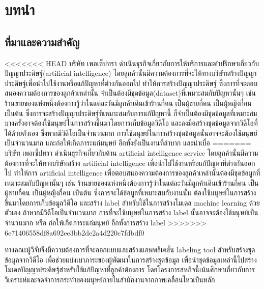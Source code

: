 \chapter{บทนำ}
\section{ที่มาและความสำคัญ}
<<<<<<< HEAD
บริษัท เพอเซ็ปทรา ดำเนินธุรกิจเกี่ยวกับการให้บริการและคำปรึกษาเกี่ยวกับปัญญาประดิษฐ์(artificial intelligence)
โดยลูกค้านั้นมีความต้องการที่จะให้ทางบริษัทสร้างปัญญาประดิษฐ์เพื่อนำไปใช้งานหรือแก้ปัญหาที่ต่างกันออกไป 
ทำให้การสร้างปัญญาประดิษฐ์ ซึ่งการที่จะตอบสนองความต้องการของลูกค้าเหล่านั้น 
จำเป็นต้องมีชุดข้อมูล(dataset)ที่เหมาะสมกับปัญหานั้นๆ เช่น ร้านขายของแห่งหนึ่งต้องการรู้ว่าในแต่ละวันมีลูกค้าเดินเข้าร้านกี่คน เป็นผู้ชายกี่คน เป็นผู้หญิงกี่คน เป็นต้น
ซึ่งการจะสร้างปัญญาประดิษฐ์ที่เหมาะสมกับการแก้ปัญหานี้ ก็จำเป็นต้องมีชุดข้อมูลที่เหมาะสม บางครั้งอาจต้องใช้มนุษย์ในการสร้างขึ้นมาโดยการเก็บข้อมูลวิดีโอ 
และลงมือสร้างชุดข้อมูลจากวิดีโอที่ได้ด้วยตัวเอง ซึ่งหากมีวิดีโอเป็นจำนวนมาก การใช้มนุษย์ในการสร้างชุดข้อมูลนั้นอาจจะต้องใช้มนุษย์เป็นจำนวนมาก 
และก่อให้เกิดภาระแก่มนุษย์ อีกทั้งยังเป็นงานที่ลำบาก และน่าเบื่อ
=======
บริษัท เพอเซ็ปทรา ดำเนินธุรกิจเกี่ยวกับด้าน artificial intelligence service โดยลูกค้านั้นมีความต้องการที่จะให้ทางบริษัทสร้าง artificial intelligence เพื่อนำไปใช้งานหรือแก้ปัญหาที่ต่างกันออกไป ทำให้การ artificial intelligence เพื่อตอบสนองความต้องการของลูกค้าเหล่านั้นต้องมีชุดข้อมูลที่เหมาะสมกับปัญหานั้นๆ เช่น ร้านขายของแห่งหนึ่งต้องการรู้ว่าในแต่ละวันมีลูกค้าเดินเข้าร้านกี่คน เป็นผู้ชายกี่คน เป็นผู้หญิงกี่คน เป็นต้น ซึ่งการจะได้ข้อมูลที่เหมาะสมกับงานนั้น ต้องใช้มนุษย์ในการสร้างขึ้นมาโดยการเก็บข้อมูลวิดีโอ และสร้าง label สำหรับใช้ในการสร้างโมเดล machine learning ด้วยตัวเอง ถ้าหากมีวิดีโอเป็นจำนวนมาก การที่จะใช้มนุษย์ในการสร้าง label นั้นอาจจะต้องใช้มนุษย์เป็นจำนวนมาก หรือ ก่อให้เกิดภาระแก่มนุษย์ อีกทั้งการสร้าง label 
>>>>>>> 6e71406558df8a692ee3bb2de2a4d220c7fdbdf0

ทางคณะผู้วิจัยจึงมีความต้องการที่จะออกแบบและสร้างแอพพลิเคชั่น labeling tool สำหรับสร้างชุดข้อมูลจากวิดีโอ เพื่อช่วยแบ่งเบาภาระของผู้พัฒนาในการสร้างชุดข้อมูล 
เพื่อนำชุดข้อมูลเหล่านี้ไปสร้างโมเดลปัญญาประดิษฐ์สำหรับใช้แก้ปัญหาที่ลูกค้าต้องการ โดยโครงการสหกิจนี้เน้นศึกษาเกี่ยวกับการวิเคราะห์และจดจำการกระทำของมนุษย์ภายในสำนักงานจากภาพเคลื่อนไหวเป็นหลัก


